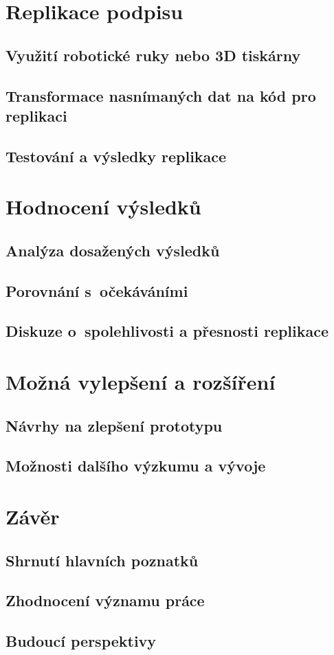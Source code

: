 \chapter{Replikace podpisu}
\section{Využití robotické ruky nebo 3D tiskárny}
\section{Transformace nasnímaných dat na kód pro replikaci}
\section{Testování a výsledky replikace}

\chapter{Hodnocení výsledků}
\section{Analýza dosažených výsledků}
\section{Porovnání s~očekáváními}
\section{Diskuze o~spolehlivosti a přesnosti replikace}

\chapter{Možná vylepšení a rozšíření}
\section{Návrhy na zlepšení prototypu}
\section{Možnosti dalšího výzkumu a vývoje}

\chapter{Závěr}
\section{Shrnutí hlavních poznatků}
\section{Zhodnocení významu práce}
\section{Budoucí perspektivy}


%
